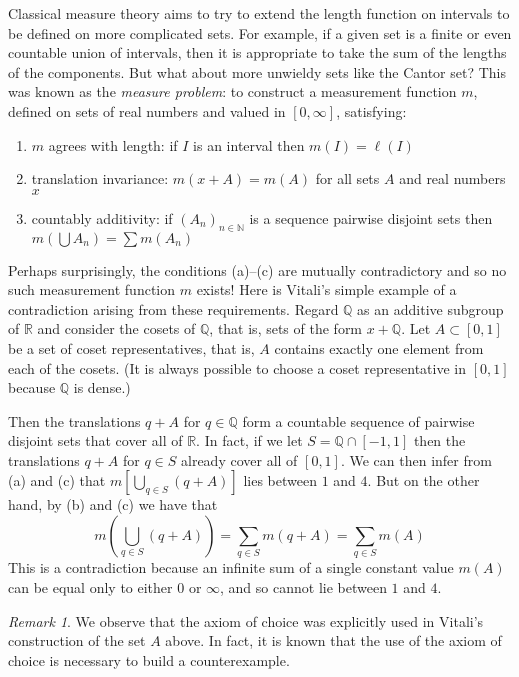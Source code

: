 \documentclass[11pt,oneside]{amsbook}
\newcommand{\NN}{\mathbb N}
\newcommand{\QQ}{\mathbb Q}
\newcommand{\RR}{\mathbb R}
\theoremstyle{definition}
\theoremstyle{plain}
\theoremstyle{definition}
\theoremstyle{remark}
\newtheorem{rem}[thm]{Remark}
\begin{document}
Classical measure theory aims to try to extend the length function on intervals to be defined on more complicated sets. For example, if a given set is a finite or even countable union of intervals, then it is appropriate to take the sum of the lengths of the components. But what about more unwieldy sets like the Cantor set? This was known as the \emph{measure problem}: to construct a measurement function $m$, defined on sets of real numbers and valued in $[0,\infty]$, satisfying:
\begin{enumerate}
\item $m$ agrees with length: if $I$ is an interval then $m(I)=\ell(I)$
\item translation invariance: $m(x+A)=m(A)$ for all sets $A$ and real numbers $x$
\item countably additivity: if $(A_n)_{n\in\NN}$ is a sequence pairwise disjoint sets then $m(\bigcup A_n)=\sum m(A_n)$
\end{enumerate}

Perhaps surprisingly, the conditions (a)--(c) are mutually contradictory and so no such measurement function $m$ exists! Here is Vitali's simple example of a contradiction arising from these requirements. Regard $\QQ$ as an additive subgroup of $\RR$ and consider the cosets of $\QQ$, that is, sets of the form $x+\QQ$. Let $A\subset[0,1]$ be a set of coset representatives, that is, $A$ contains exactly one element from each of the cosets. (It is always possible to choose a coset representative in $[0,1]$ because $\QQ$ is dense.)

Then the translations $q+A$ for $q\in\QQ$ form a countable sequence of pairwise disjoint sets that cover all of $\RR$. In fact, if we let $S=\QQ\cap[-1,1]$ then the translations $q+A$ for $q\in S$ already cover all of $[0,1]$. We can then infer from (a) and (c) that $m[\bigcup_{q\in S}(q+A)]$ lies between $1$ and $4$. But on the other hand, by (b) and (c) we have that 
\[m\left(\bigcup_{q\in S}(q+A)\right)=\sum_{q\in S}m(q+A)=\sum_{q\in S}m(A)
\]
This is a contradiction because an infinite sum of a single constant value $m(A)$ can be equal only to either $0$ or $\infty$, and so cannot lie between $1$ and $4$.

\begin{rem}
  We observe that the axiom of choice was explicitly used in Vitali's construction of the set $A$ above. In fact, it is known that the use of the axiom of choice is necessary to build a counterexample.
\end{rem}
\end{document}
